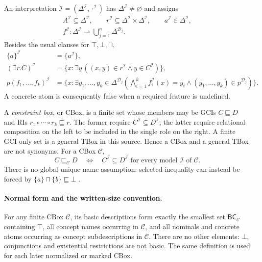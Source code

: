 An interpretation \(\mathcal I=(\Delta^{\mathcal I},\cdot^{\mathcal I})\)
has \(\Delta^{\mathcal I}\ne\varnothing\) and assigns
\[
\begin{gathered}
 A^{\mathcal I}\subseteq\Delta^{\mathcal I},\qquad
 r^{\mathcal I}\subseteq\Delta^{\mathcal I}\times\Delta^{\mathcal I},
 \qquad a^{\mathcal I}\in\Delta^{\mathcal I},\\
 f^{\mathcal I}:\Delta^{\mathcal I}\rightharpoonup
       \bigcup_{j=1}^{n}\Delta^{\mathcal D_j}.
\end{gathered}
\]
Besides the usual clauses for \(\top,\bot,\sqcap\),
\[
\begin{aligned}
 \{a\}^{\mathcal I}&=\{a^{\mathcal I}\},\\
 (\exists r.C)^{\mathcal I}
 &=\{x:\exists y\,((x,y)\in r^{\mathcal I}\land y\in C^{\mathcal I})\},\\
 p(f_1,\ldots,f_k)^{\mathcal I}
 &=\{x:\exists y_1,\ldots,y_k\in\Delta^{\mathcal D_j}
       (\bigwedge_{i=1}^{k}f_i^{\mathcal I}(x)=y_i
        \land (y_1,\ldots,y_k)\in p^{\mathcal D_j})\}.
\end{aligned}
\]
A concrete atom is consequently false when a required feature is undefined.

A \emph{constraint box}, or CBox, is a finite set whose members may be GCIs
\(C\sqsubseteq D\) and RIs
\(r_1\circ\cdots\circ r_k\sqsubseteq r\).  The former require
\(C^{\mathcal I}\subseteq D^{\mathcal I}\); the latter require relational
composition on the left to be included in the single role on the right.  A
finite GCI-only set is a general TBox in this source.  Hence a CBox and a
general TBox are not synonyms.  For a CBox \(\mathcal C\),
\[
 C\sqsubseteq_{\mathcal C}D
 \quad\Longleftrightarrow\quad
 C^{\mathcal I}\subseteq D^{\mathcal I}
 \text{ for every model \(\mathcal I\) of \(\mathcal C\)}.
\]
There is no global unique-name assumption: selected inequality can instead be
forced by \(\{a\}\sqcap\{b\}\sqsubseteq\bot\)
\cite[table~1 and \S2]{BaaderBrandtLutz2005}.

\paragraph{Normal form and the written-size convention.}
\label{sec:p09-elpp-normalization}
For any finite CBox \(\mathcal C\), its basic descriptions form exactly
the smallest set \(\mathsf{BC}_{\mathcal C}\) containing \(\top\), all
concept names occurring in \(\mathcal C\), and all nominals and concrete
atoms occurring as concept subdescriptions in \(\mathcal C\).
There are no other elements: \(\bot\), conjunctions and existential
restrictions are not basic.  The same definition is used for each later
normalized or marked CBox.

